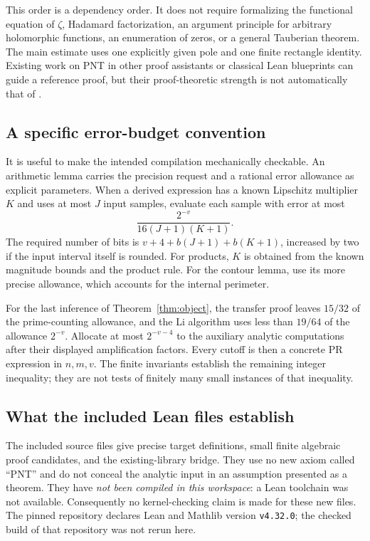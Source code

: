 This order is a dependency order. It does not require formalizing the
functional equation of $\zeta$, Hadamard factorization, an argument principle
for arbitrary holomorphic functions, an enumeration of zeros, or a general
Tauberian theorem. The main estimate uses one explicitly given pole and
one finite rectangle identity. Existing work on PNT in other proof
assistants or classical Lean blueprints can guide a reference proof, but
their proof-theoretic strength is not automatically that of \ipra.

\subsection{A specific error-budget convention}

It is useful to make the intended compilation mechanically checkable.
An arithmetic lemma carries the precision request and a rational error
allowance as explicit parameters. When a derived expression has a known
Lipschitz multiplier $K$ and uses at most $J$ input samples, evaluate
each sample with error at most
\[
 \frac{2^{-v}}{16(J+1)(K+1)}.
\]
The required number of bits is
$v+4+b(J+1)+b(K+1)$, increased by two if the input interval itself is
rounded. For products, $K$ is obtained from the known magnitude bounds
and the product rule. For the contour lemma, use its more precise
allowance, which accounts for the internal perimeter.

For the last inference of Theorem~\ref{thm:object}, the transfer proof
leaves $15/32$ of the prime-counting allowance, and the Li algorithm
uses less than $19/64$ of the allowance $2^{-v}$. Allocate at most
$2^{-v-4}$ to the auxiliary analytic computations after their displayed
amplification factors. Every cutoff is then a concrete PR expression in
$n,m,v$. The finite invariants establish the remaining integer inequality;
they are not tests of finitely many small instances of that inequality.

\subsection{What the included Lean files establish}

The included source files give precise target definitions, small finite
algebraic proof candidates, and the existing-library bridge. They use no
new axiom called ``PNT'' and do not conceal the analytic input in an
assumption presented as a theorem. They have \emph{not been compiled in
this workspace}: a Lean toolchain was not available. Consequently no
kernel-checking claim is made for these new files. The pinned repository
declares Lean and Mathlib version \texttt{v4.32.0}; the checked build of
that repository was not rerun here.

